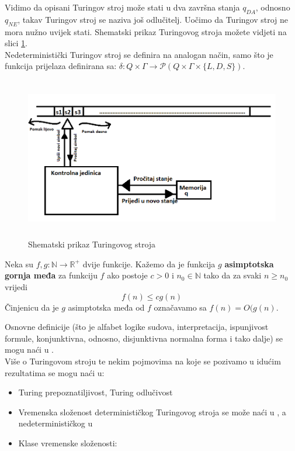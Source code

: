 \documentclass[12pt, a4paper]{book}
\begin{document}
\begin{spacing}{1.5}
\begin{nap}
Vidimo da opisani Turingov stroj može stati u dva završna stanja $q_{DA}$, odnosno $q_{NE}$, takav Turingov stroj se naziva još odlučitelj. Uočimo da Turingov stroj ne mora nužno uvijek stati. Shematski prikaz Turingovog stroja možete vidjeti na slici \ref{fig:Turing}.\\
Nedeterministički Turingov stroj se definira na analogan način, samo što je funkcija prijelaza definirana sa: $\delta : Q \times \Gamma \to \mathcal{P}(Q \times \Gamma \times \{L,D,S\})$. 
\end{nap}
\begin{figure}[h!t]
\centering \includegraphics[height=200pt, width=400pt]{Turing.png}
\caption{Shematski prikaz Turingovog stroja}
\label{fig:Turing}
\end{figure} 
\begin{defn}
Neka su $f, g: \mathbb{N} \to \mathbb{R}^{+}$ dvije funkcije. Kažemo da je funkcija $g$ \textbf{asimptotska gornja međa} za funkciju $f$ ako postoje $c>0$ i $n_0 \in \mathbb{N}$ tako da za svaki $n \geq n_0$ vrijedi
\[f(n)\leq cg(n)\]
Činjenicu da je $g$ asimptotska međa od $f$ označavamo sa $f(n)=O(g(n)$. 
\end{defn}
Osnovne definicije (što je alfabet logike sudova, interpretacija, ispunjivost formule, konjunktivna, odnosno, disjunktivna normalna forma  i tako dalje) se mogu naći u \cite[str. ~12-25]{Vukovic}.\\
Više o Turingovom stroju te nekim pojmovima na koje se pozivamo u idućim rezultatima se mogu naći u:
\begin{itemize}
\item Turing prepoznatiljivost, Turing odlučivost \cite[str. ~141-142]{Sipser}
\item Vremenska složenost determinističkog Turingovog stroja se može naći u \cite[str. ~248]{Sipser}, a nedeterminističkog u \cite[str. ~255]{Sipser}
\item Klase vremenske složenosti:

\end{itemize}
\end{spacing}
\end{document}
